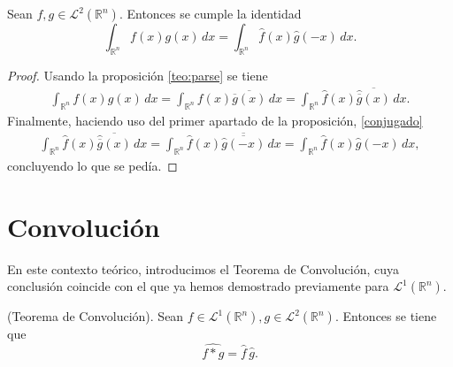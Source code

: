 \begin{corolario}\label{coro}
    Sean $f,g \in \mathscr{L}^2(\mathbb{R}^n)$. Entonces se cumple la identidad
\begin{equation}
    \int_{\mathbb{R}^n} f(x) g(x) \, dx = \int_{\mathbb{R}^n} \widehat{f}(x) \widehat{g}(-x)\, dx.
\end{equation}
\end{corolario}

\begin{proof}
Usando la proposición \ref{teo:parse} se tiene 
\begin{align*}
    \int_{\mathbb{R}^n} f(x) g(x) \, dx = \int_{\mathbb{R}^n} f(x) \overline{\overline{g}(x)} \, dx
    = \int_{\mathbb{R}^n} \widehat{f}(x) \overline{\widehat{\overline{g}}(x)} \, dx.
\end{align*}
Finalmente, haciendo uso del primer apartado de la proposición, \ref{conjugado}
\begin{align*}
     \int_{\mathbb{R}^n} \widehat{f}(x) \overline{\widehat{\overline{g}}(x)} \, dx = \int_{\mathbb{R}^n} \widehat{f}(x) \overline{\overline{\widehat{g}(-x)}} \, dx = \int_{\mathbb{R}^n} \widehat{f}(x) \widehat{g}(-x) \, dx,
\end{align*}
concluyendo lo que se pedía.
\end{proof}


\section{Convolución}

En este contexto teórico, introducimos el Teorema de Convolución, cuya conclusión coincide con el que ya hemos demostrado previamente para $\mathscr{L}^1(\mathbb{R}^n)$.

\begin{teorema} (Teorema de Convolución). Sean $f \in \mathscr{L}^1(\mathbb{R}^n), g \in \mathscr{L}^2(\mathbb{R}^n)$. Entonces se tiene que 
\begin{equation}
    \widehat{f*g} = \widehat{f} \,\widehat{g}.
\end{equation}
    
\end{teorema}

